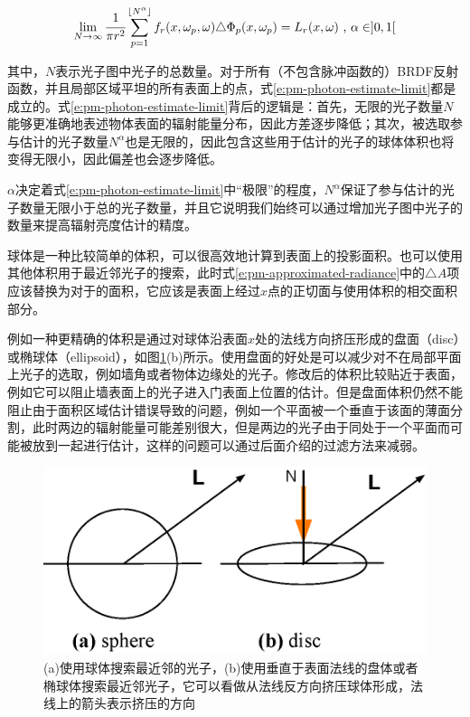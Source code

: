 \begin{equation}\label{e:pm-photon-estimate-limit}
	\lim_{N\to\infty} \cfrac{1}{\pi r^{2}}\sum^{\lfloor N^{\alpha}\rfloor}_{p=1}f_r(x,{\omega}_p,{\omega})\triangle\Phi_p(x,{\omega}_p)=L_r(x,{\omega})\text{ , }\alpha\in ]0,1[
\end{equation}

\noindent 其中，$N$表示光子图中光子的总数量。对于所有（不包含脉冲函数的）BRDF反射函数，并且局部区域平坦的所有表面上的点，式\ref{e:pm-photon-estimate-limit}都是成立的。式\ref{e:pm-photon-estimate-limit}背后的逻辑是：首先，无限的光子数量$N$能够更准确地表述物体表面的辐射能量分布，因此方差逐步降低；其次，被选取参与估计的光子数量$N^{\alpha}$也是无限的，因此包含这些用于估计的光子的球体体积也将变得无限小，因此偏差也会逐步降低。

$\alpha$决定着式\ref{e:pm-photon-estimate-limit}中“极限”的程度，$N^{\alpha}$保证了参与估计的光子数量无限小于总的光子数量，并且它说明我们始终可以通过增加光子图中光子的数量来提高辐射亮度估计的精度。

球体是一种比较简单的体积，可以很高效地计算到表面上的投影面积。也可以使用其他体积用于最近邻光子的搜索，此时式\ref{e:pm-approximated-radiance}中的$\triangle A$项应该替换为对于的面积，它应该是表面上经过$x$点的正切面与使用体积的相交面积部分。

例如一种更精确的体积是通过对球体沿表面$x$处的法线方向挤压形成的盘面（disc）或椭球体（ellipsoid），如图\ref{f:pm-sphere-and-disc}(b)所示。使用盘面的好处是可以减少对不在局部平面上光子的选取，例如墙角或者物体边缘处的光子。修改后的体积比较贴近于表面，例如它可以阻止墙表面上的光子进入门表面上位置的估计。但是盘面体积仍然不能阻止由于面积区域估计错误导致的问题，例如一个平面被一个垂直于该面的薄面分割，此时两边的辐射能量可能差别很大，但是两边的光子由于同处于一个平面而可能被放到一起进行估计，这样的问题可以通过后面介绍的过滤方法来减弱。

\begin{figure}
\sidecaption
	\includegraphics[width=.55\textwidth]{figures/pm/disc}
\caption{(a)使用球体搜索最近邻的光子，(b)使用垂直于表面法线的盘体或者椭球体搜索最近邻光子，它可以看做从法线反方向挤压球体形成，法线上的箭头表示挤压的方向}
\label{f:pm-sphere-and-disc}
\end{figure}





